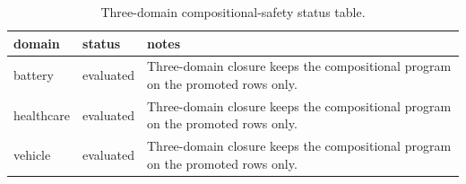 \begin{table}[htbp]
\centering
\caption{Three-domain compositional-safety status table.}
\label{tab:three-domain-paper5-matrix}
\begin{tabular}{lll}
\toprule
\textbf{domain} & \textbf{status} & \textbf{notes} \\
\midrule
battery & evaluated & Three-domain closure keeps the compositional program on the promoted rows only. \\
healthcare & evaluated & Three-domain closure keeps the compositional program on the promoted rows only. \\
vehicle & evaluated & Three-domain closure keeps the compositional program on the promoted rows only. \\
\bottomrule
\end{tabular}
\end{table}
